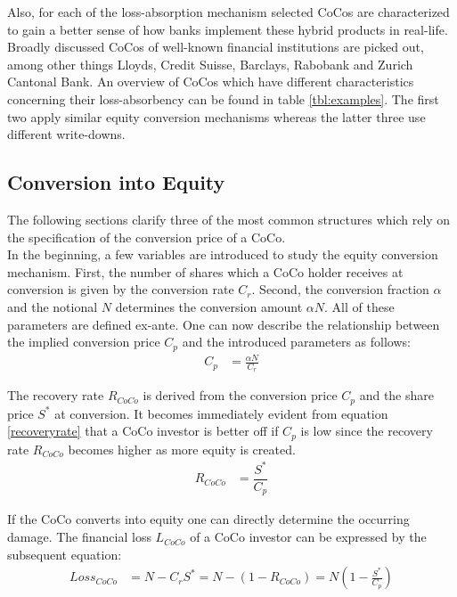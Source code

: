 Also, for each of the loss-absorption mechanism selected CoCos are characterized to gain a better sense of how banks implement these hybrid products in real-life. Broadly discussed CoCos of well-known financial institutions are picked out, among other things Lloyds, Credit Suisse, Barclays, Rabobank and Zurich Cantonal Bank. An overview of CoCos which have different characteristics concerning their loss-absorbency can be found in table \ref{tbl:examples}. The first two apply similar equity conversion mechanisms whereas the latter three use different write-downs.

\subsection{Conversion into Equity}
The following sections clarify three of the most common structures which rely on the specification of the conversion price of a CoCo.\\

In the beginning, a few variables are introduced to study the equity conversion mechanism. First, the number of shares which a CoCo holder receives at conversion is given by the conversion rate $C_r$. Second, the conversion fraction $\alpha$ and the notional $N$ determines the conversion amount $\alpha N$. All of these parameters are defined ex-ante. One can now describe the relationship between the implied conversion price $C_p$ and the introduced parameters as follows: \citep{de2014handbook}
\begin{align}
C_p &= \frac{\alpha N}{C_r}
\end{align}

The recovery rate $R_{CoCo}$ is derived from the conversion price $C_p$ and the share price $S^*$ at conversion. It becomes immediately evident from equation \ref{recoveryrate} that a CoCo investor is better off if $C_p$ is low since the recovery rate $R_{CoCo}$ becomes higher as more equity is created. 
\begin{align} \label{recoveryrate}
R_{CoCo} &= \dfrac{S^*}{C_p}
\end{align}

If the CoCo converts into equity one can directly determine the occurring damage. The financial loss $L_{CoCo}$ of a CoCo investor can be expressed by the subsequent equation:
\begin{align}
{Loss}_{CoCo} &= N - C_r S^* = N - (1 - R_{CoCo}) = N \left(1 - \frac{S^{*}}{C_p} \right)
\end{align}

